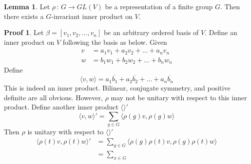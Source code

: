 \documentclass{book}
\newcommand{\inner}[1]{\langle #1 \rangle}
\theoremstyle{definition}
\newtheorem{lemma}{Lemma}[chapter]
\theoremstyle{remarkstyle}
\newtheorem*{myproof}{Proof}%
\begin{document}
\begin{lemma}
    Let $\rho\,:\,G\rightarrow GL(V)$ be a representation of a finite group $G$. Then there exists a $G$-invariant inner product on $V$.
\end{lemma}
\begin{myproof}
    Let $\beta=[v_1,v_2,\dots,v_n] $ be an arbitrary ordered basis of $V$. Define an inner product on $V$ following the basis as below. Given 
    \begin{align*}
        v &= a_1v_1 + a_2v_2 + \dots + a_nv_n \\
        w &= b_1w_1 + b_2w_2 + \dots + b_nw_n
    \end{align*}
    Define 
    $$
    \inner{v,w} = a_1\overline{b_1} + a_2\overline{b_2} + \dots + a_n\overline{b_n}
    $$
    This is indeed an inner product. Bilinear, conjugate symmetry, and positive definite are all obvious.
    However, $\rho$ may not be unitary with respect to this inner product. Define another inner product $\inner{}'$
    $$
    \inner{v,w}'=\sum_{g\in G}\inner{\rho(g)v, \rho(g)w}
    $$
    Then $\rho$ is unitary with respect to $\inner{}'$
    \begin{align*}
        \inner{\rho(t)v,\rho(t)w }' 
        &= \sum_{g\in G}\inner{\rho(g)\rho(t)v,\rho(g)\rho(t)w} \\
        &= \sum_{x\in G}
    \end{align*}
    \newline 
\end{myproof}
\end{document}

